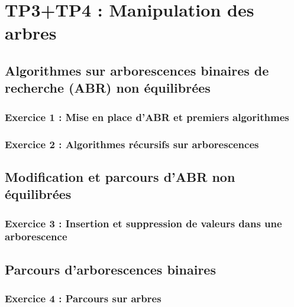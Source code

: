 \chapter{TP3+TP4 : Manipulation des arbres}
    \section{Algorithmes sur arborescences binaires de recherche (ABR) non équilibrées}
        \subsection{Exercice 1 : Mise en place d’ABR et premiers algorithmes}
        \subsection{Exercice 2 : Algorithmes récursifs sur arborescences}
    \section{Modification et parcours d’ABR non équilibrées}
        \subsection{Exercice 3 : Insertion et suppression de valeurs dans une arborescence}
    \section{Parcours d’arborescences binaires}
        \subsection{Exercice 4 : Parcours sur arbres}
